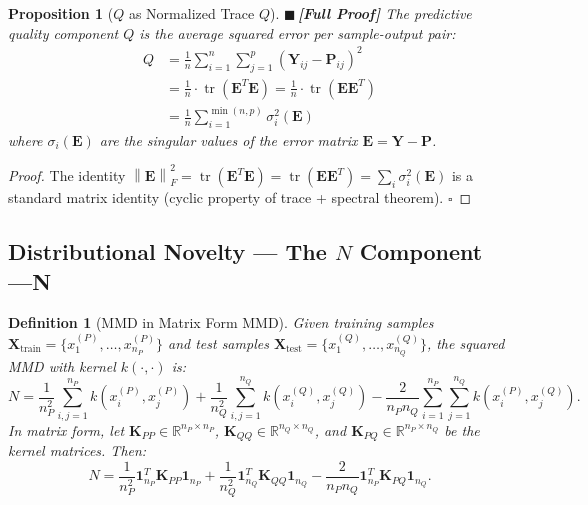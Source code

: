 \documentclass[12pt,a4paper]{article}
\newtheorem{proposition}[theorem]{Proposition}
\newtheorem{definition}[theorem]{Definition}
\theoremstyle{definition}
\newcommand{\rigorFull}{{\color{rigorcolor}$\blacksquare$\,\textbf{[Full Proof]}}}
\DeclareMathOperator{\tr}{tr}
\newcommand{\R}{\mathbb{R}}
\newcommand{\norm}[1]{\left\lVert#1\right\rVert}
\newcommand{\ones}{\mathbf{1}}
\newcommand{\mat}[1]{\mathbf{#1}}
\begin{document}
\begin{proposition}[$Q$ as Normalized Trace $Q$]\label{prop:Q_trace}
\rigorFull
The predictive quality component $Q$ is the average squared error per sample-output pair:
\begin{align*}
    Q &= \frac{1}{n} \sum_{i=1}^{n} \sum_{j=1}^{p} (\mat{Y}_{ij} - \mat{P}_{ij})^2 \\
    &= \frac{1}{n} \cdot \tr(\mat{E}^T \mat{E}) = \frac{1}{n} \cdot \tr(\mat{E} \mat{E}^T) \\
    &= \frac{1}{n} \sum_{i=1}^{\min(n,p)} \sigma_i^2(\mat{E})
\end{align*}
where $\sigma_i(\mat{E})$ are the singular values of the error matrix $\mat{E} = \mat{Y} - \mat{P}$.
\end{proposition}

\begin{proof}
The identity $\norm{\mat{E}}_F^2 = \tr(\mat{E}^T \mat{E}) = \tr(\mat{E} \mat{E}^T) = \sum_i \sigma_i^2(\mat{E})$ 
is a standard matrix identity (cyclic property of trace + spectral theorem). \hfill $\square$
\end{proof}

\subsection{Distributional Novelty — The $N$ Component ---N}

\begin{definition}[MMD in Matrix Form MMD]\label{def:mmd_matrix}
Given training samples $\mat{X}_{\text{train}} = \{x_1^{(P)}, \ldots, x_{n_P}^{(P)}\}$ 
and test samples $\mat{X}_{\text{test}} = \{x_1^{(Q)}, \ldots, x_{n_Q}^{(Q)}\}$, 
the squared MMD with kernel $k(\cdot, \cdot)$ is:
\begin{equation}\label{eq:mmd_formula}
    N = \frac{1}{n_P^2}\sum_{i,j=1}^{n_P} k(x_i^{(P)}, x_j^{(P)}) + \frac{1}{n_Q^2}\sum_{i,j=1}^{n_Q} k(x_i^{(Q)}, x_j^{(Q)}) - \frac{2}{n_P n_Q}\sum_{i=1}^{n_P}\sum_{j=1}^{n_Q} k(x_i^{(P)}, x_j^{(Q)}).
\end{equation}
In matrix form, let $\mat{K}_{PP} \in \R^{n_P \times n_P}$, $\mat{K}_{QQ} \in \R^{n_Q \times n_Q}$,
and $\mat{K}_{PQ} \in \R^{n_P \times n_Q}$ be the kernel matrices. Then:
\begin{equation}\label{eq:mmd_matrix_form}
    \boxed{N = \frac{1}{n_P^2} \ones_{n_P}^T \mat{K}_{PP} \ones_{n_P} + \frac{1}{n_Q^2} \ones_{n_Q}^T \mat{K}_{QQ} \ones_{n_Q} - \frac{2}{n_P n_Q} \ones_{n_P}^T \mat{K}_{PQ} \ones_{n_Q}}.
\end{equation}
\end{definition}
\end{document}
